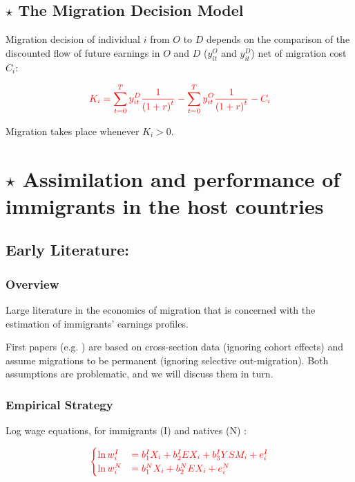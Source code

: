     \subsection{$\star$ The Migration Decision Model}

        Migration decision of individual $i$ from $O$ to $D$ depends on the comparison of the discounted flow of future earnings in $O$ and $D$ ($y_{it}^O$ and $y_{it}^D$) net of migration cost $C_i$:
        
        \[\color{red} K_i = \sum_{t=0}^{T} y_{it}^D \frac{1}{{(1+r)}^t} - \sum_{t=0}^{T} y_{it}^O \frac{1}{{(1+r)}^t} - C_i\]

        Migration takes place whenever $K_i>0$.


\section{$\star$ Assimilation and performance of immigrants in the host countries}

    \subsection{Early Literature: \cite{chiswick_effect_1978}}

        \subsubsection{Overview}

            Large literature in the economics of migration that is concerned with the estimation of immigrants’ earnings profiles.
            
            First papers (e.g. \cite{chiswick_effect_1978}) are based on cross-section data (ignoring cohort effects) and assume migrations to be permanent (ignoring selective out-migration). Both assumptions are problematic, and we will discuss them in turn.

        \subsubsection{Empirical Strategy}

            Log wage equations, for immigrants (I) and natives (N) :

            \begin{equation*}
                \color{red}
                \begin{cases}
                    \ln w_{i}^I  & = b_{1}^IX_{i} + b_{2}^IEX_{i} + b_{3}^IYSM_{i} + e_{i}^I \\
                    \ln w_{i}^N  & = b_{1}^NX_{i} + b_{2}^NEX_{i} + e_{i}^N
                \end{cases}
            \end{equation*}

